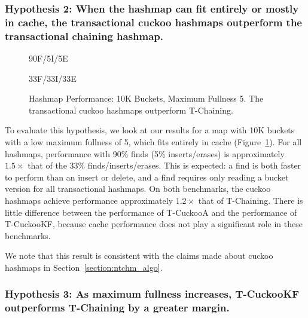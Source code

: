 \subsubsection{Hypothesis 2: When the hashmap can fit entirely or mostly in cache, the transactional cuckoo hashmaps outperform the transactional chaining hashmap.}

\begin{figure}[H]
    \centering
    \begin{minipage}{0.75\textwidth}
	\caption*{90F/5I/5E}
        \vspace{12pt}
    \end{minipage}
    \begin{minipage}{0.75\textwidth}
	\caption*{33F/33I/33E}
    \end{minipage}
    \caption[Hashmap Performance: 10K Buckets, Maximum Fullness 5]{Hashmap Performance: 10K Buckets, Maximum Fullness 5. The transactional cuckoo hashmaps outperform T-Chaining.}
    \label{fig:hm_5}
\end{figure}

To evaluate this hypothesis, we look at our results for a map with 10K buckets with a low maximum fullness of 5, which fits entirely in cache (Figure~\ref{fig:hm_5}).
For all hashmaps, performance with 90\% finds (5\% inserts/erases) is approximately $1.5\times$ that of the 33\% finds/inserts/erases. This is expected: a find is both faster to perform than an insert or delete, and a find requires only reading a bucket version for all transactional hashmaps.
On both benchmarks, the cuckoo hashmaps achieve performance approximately $1.2\times$ that of T-Chaining. There is little difference between the performance of T-CuckooA and the performance of T-CuckooKF, because cache performance does not play a significant role in these benchmarks.

We note that this result is consistent with the claims made about cuckoo hashmaps in Section~\ref{section:ntchm_algo}.


\vspace{12pt}
\noindent{}


\subsubsection{Hypothesis 3: As maximum fullness increases, T-CuckooKF outperforms T-Chaining by a greater margin.}


